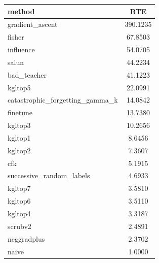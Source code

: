 \begin{tabular}{lc}
\toprule
method & RTE \\
\midrule
gradient_ascent & 390.1235 \\
fisher & 67.8503 \\
influence & 54.0705 \\
salun & 44.2234 \\
bad_teacher & 41.1223 \\
kgltop5 & 22.0991 \\
catastrophic_forgetting_gamma_k & 14.0842 \\
finetune & 13.7380 \\
kgltop3 & 10.2656 \\
kgltop1 & 8.6456 \\
kgltop2 & 7.3607 \\
cfk & 5.1915 \\
successive_random_labels & 4.6933 \\
kgltop7 & 3.5810 \\
kgltop6 & 3.5110 \\
kgltop4 & 3.3187 \\
scrubv2 & 2.4891 \\
neggradplus & 2.3702 \\
naive & 1.0000 \\
\bottomrule
\end{tabular}
